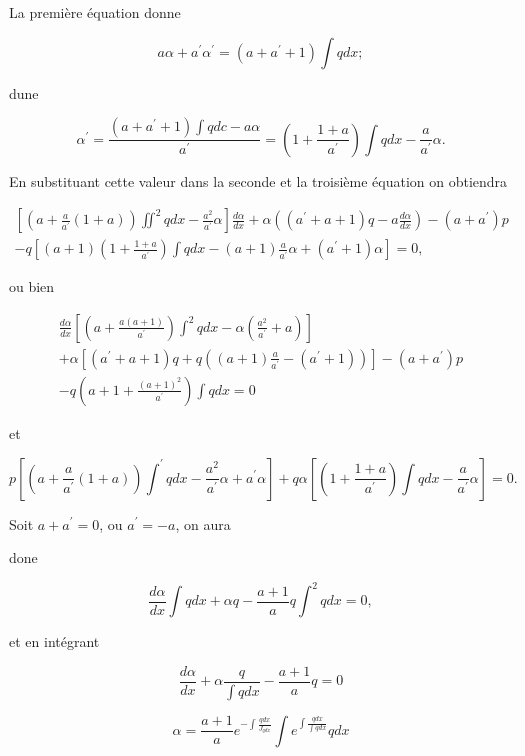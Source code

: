 \documentclass{article}
\begin{document}
La première équation donne

\[
a \alpha+a^{\prime} \alpha^{\prime}=\left(a+a^{\prime}+1\right) \int q d x ;
\]

dune

\[
\alpha^{\prime}=\frac{\left(a+a^{\prime}+1\right) \int q d c-a \alpha}{a^{\prime}}=\left(1+\frac{1+a}{a^{\prime}}\right) \int q d x-\frac{a}{a^{\prime}} \alpha .
\]

En substituant cette valeur dans la seconde et la troisième équation on obtiendra

\[
\begin{gathered}
{\left[\left(a+\frac{a}{a^{\prime}}(1+a)\right) \iint^{2} q d x-\frac{a^{2}}{a^{\prime}} \alpha\right] \frac{d \alpha}{d x}+\alpha\left(\left(a^{\prime}+a+1\right) q-a \frac{d \alpha}{d x}\right)-\left(a+a^{\prime}\right) p} \\
-q\left[(a+1)\left(1+\frac{1+a}{a^{\prime}}\right) \int q d x-(a+1) \frac{a}{a^{\prime}} \alpha+\left(a^{\prime}+1\right) \alpha\right]=0,
\end{gathered}
\]

ou bien

\[
\begin{gathered}
\frac{d \alpha}{d x}\left[\left(a+\frac{a(a+1)}{a^{\prime}}\right) \int^{2} q d x-\alpha\left(\frac{a^{2}}{a^{\prime}}+a\right)\right] \\
+\alpha\left[\left(a^{\prime}+a+1\right) q+q\left((a+1) \frac{a}{a^{\prime}}-\left(a^{\prime}+1\right)\right)\right]-\left(a+a^{\prime}\right) p \\
-q\left(a+1+\frac{(a+1)^{2}}{a^{\prime}}\right) \int q d x=0
\end{gathered}
\]

et

\[
p\left[\left(a+\frac{a}{a^{\prime}}(1+a)\right) \int^{\prime} q d x-\frac{a^{2}}{a^{\prime}} \alpha+a^{\prime} \alpha\right]+q \alpha\left[\left(1+\frac{1+a}{a^{\prime}}\right) \int q d x-\frac{a}{a^{\prime}} \alpha\right]=0 .
\]

Soit \(a+a^{\prime}=0\), ou \(a^{\prime}=-a\), on aura

done

\[
\frac{d \alpha}{d x} \int q d x+\alpha q-\frac{a+1}{a} q \int^{2} q d x=0,
\]

et en intégrant

\[
\frac{d \alpha}{d x}+\alpha \frac{q}{\int q d x}-\frac{a+1}{a} q=0
\]

\[
\alpha=\frac{a+1}{a} e^{-\int \frac{q d x}{J_{q d x}}} \int e^{\int \frac{q d x}{\int q d x}} q d x
\]
\end{document}
